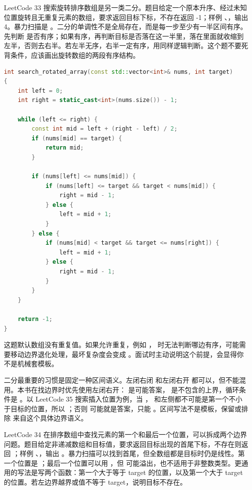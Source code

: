 LeetCode 33 搜索旋转排序数组是另一类二分。题目给定一个原本升序、经过未知位置旋转且无重复元素的数组，要求返回目标下标，不存在返回 -1；样例 、，输出 4。暴力扫描是 。二分的单调性不是全局存在，而是每一步至少有一半区间有序。先判断  是否有序；如果有序，再判断目标是否落在这一半里，落在里面就收缩到左半，否则去右半。若左半无序，右半一定有序，用同样逻辑判断。这个题不要死背条件，应该画出旋转数组的两段有序结构。

\begin{lstlisting}[language=C++,caption={LeetCode 33 搜索旋转排序数组}]
int search_rotated_array(const std::vector<int>& nums, int target)
{
    int left = 0;
    int right = static_cast<int>(nums.size()) - 1;

    while (left <= right) {
        const int mid = left + (right - left) / 2;
        if (nums[mid] == target) {
            return mid;
        }

        if (nums[left] <= nums[mid]) {
            if (nums[left] <= target && target < nums[mid]) {
                right = mid - 1;
            } else {
                left = mid + 1;
            }
        } else {
            if (nums[mid] < target && target <= nums[right]) {
                left = mid + 1;
            } else {
                right = mid - 1;
            }
        }
    }

    return -1;
}
\end{lstlisting}

这题默认数组没有重复值。如果允许重复，例如 \code{[1, 0, 1, 1, 1]}， 时无法判断哪边有序，可能需要移动边界退化处理，最坏复杂度会变成 。面试时主动说明这个前提，会显得你不是机械套模板。

二分最重要的习惯是固定一种区间语义。左闭右闭  和左闭右开 \code{[left, right)} 都可以，但不能混用。本书在找边界时优先使用左闭右开： 是可能答案， 是不包含的上界，循环条件是 。以 LeetCode 35 搜索插入位置为例，当 ， 和左侧都不可能是第一个不小于目标的位置，所以 ；否则  可能就是答案，只能 。区间写法不是模板，保留或排除  来自这个具体边界语义。

LeetCode 34 在排序数组中查找元素的第一个和最后一个位置，可以拆成两个边界问题。题目给定非递减数组和目标值，要求返回目标出现的首尾下标，不存在则返回 \code{[-1,-1]}；样例 、，输出 \code{[3,4]}。暴力扫描可以找到首尾，但全数组都是目标时仍是线性。第一个位置是 ；最后一个位置可以用 ，但  可能溢出，也不适用于非整数类型。更通用的写法是写两个函数：第一个大于等于 target 的位置，以及第一个大于 target 的位置。若左边界越界或值不等于 target，说明目标不存在。

